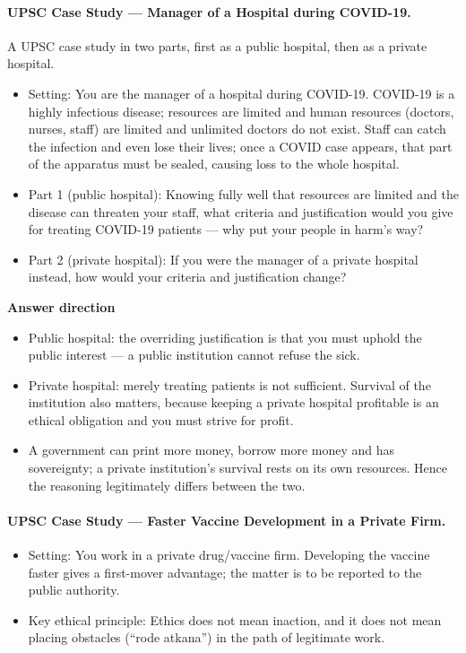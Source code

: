\paragraph{UPSC Case Study --- Manager of a Hospital during COVID-19.} A UPSC case study in two parts, first as a public hospital, then as a private hospital.

\begin{PYQLink}
\begin{itemize}
\item Setting: You are the manager of a hospital during COVID-19. COVID-19 is a highly infectious disease; resources are limited and human resources (doctors, nurses, staff) are limited and unlimited doctors do not exist. Staff can catch the infection and even lose their lives; once a COVID case appears, that part of the apparatus must be sealed, causing loss to the whole hospital.
\item Part 1 (public hospital): Knowing fully well that resources are limited and the disease can threaten your staff, what criteria and justification would you give for treating COVID-19 patients --- why put your people in harm's way?
\item Part 2 (private hospital): If you were the manager of a private hospital instead, how would your criteria and justification change?
\end{itemize}
\end{PYQLink}

\begin{ExampleBox}
\textbf{Answer direction}
\begin{itemize}
\item Public hospital: the overriding justification is that you must uphold the public interest --- a public institution cannot refuse the sick.
\item Private hospital: merely treating patients is not sufficient. Survival of the institution also matters, because keeping a private hospital profitable is an ethical obligation and you must strive for profit.
\item A government can print more money, borrow more money and has sovereignty; a private institution's survival rests on its own resources. Hence the reasoning legitimately differs between the two.
\end{itemize}
\end{ExampleBox}

\paragraph{UPSC Case Study --- Faster Vaccine Development in a Private Firm.}
\begin{PYQLink}
\begin{itemize}
\item Setting: You work in a private drug/vaccine firm. Developing the vaccine faster gives a first-mover advantage; the matter is to be reported to the public authority.
\item Key ethical principle: Ethics does not mean inaction, and it does not mean placing obstacles (``rode atkana'') in the path of legitimate work.
\end{itemize}
\end{PYQLink}

